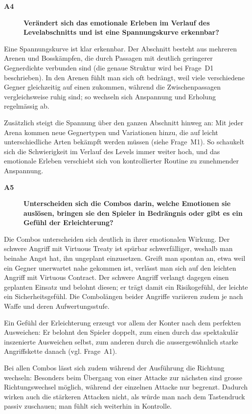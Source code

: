 \documentclass[../Main.tex]{subfiles}
\begin{document}
\begin{description}
  \item[\textbf{A4}] \textbf{Verändert sich das emotionale Erleben im Verlauf des Levelabschnitts und ist eine Spannungskurve erkennbar?}
\end{description}

Eine Spannungskurve ist klar erkennbar. Der Abschnitt besteht aus mehreren Arenen und Bosskämpfen, die durch Passagen mit deutlich geringerer Gegnerdichte verbunden sind (die genaue Struktur wird bei Frage~D1 beschrieben). In den Arenen fühlt man sich oft bedrängt, weil viele verschiedene Gegner gleichzeitig auf einen zukommen, während die Zwischenpassagen vergleichsweise ruhig sind; so wechseln sich Anspannung und Erholung regelmässig ab.

Zusätzlich steigt die Spannung über den ganzen Abschnitt hinweg an: Mit jeder Arena kommen neue Gegnertypen und Variationen hinzu, die auf leicht unterschiedliche Arten bekämpft werden müssen (siehe Frage~M1). So schaukelt sich die Schwierigkeit im Verlauf des Levels immer weiter hoch, und das emotionale Erleben verschiebt sich von kontrollierter Routine zu zunehmender Anspannung.

\begin{description}
  \item[\textbf{A5}] \textbf{Unterscheiden sich die Combos darin, welche Emotionen sie auslösen, bringen sie den Spieler in Bedrängnis oder gibt es ein Gefühl der Erleichterung?}
\end{description}

Die Combos unterscheiden sich deutlich in ihrer emotionalen Wirkung. Der schwere Angriff mit Virtuous Treaty ist spürbar schwerfälliger, weshalb man beinahe Angst hat, ihn ungeplant einzusetzen. Greift man spontan an, etwa weil ein Gegner unerwartet nahe gekommen ist, verlässt man sich auf den leichten Angriff mit Virtuous Contract. Der schwere Angriff verlangt dagegen einen geplanten Einsatz und belohnt diesen; er trägt damit ein Risikogefühl, der leichte ein Sicherheitsgefühl. Die Combolängen beider Angriffe variieren zudem je nach Waffe und deren Aufwertungsstufe.

Ein Gefühl der Erleichterung erzeugt vor allem der Konter nach dem perfekten Ausweichen: Er belohnt den Spieler doppelt, zum einen durch das spektakulär inszenierte Ausweichen selbst, zum anderen durch die aussergewöhnlich starke Angriffskette danach (vgl. Frage~A1).

Bei allen Combos lässt sich zudem während der Ausführung die Richtung wechseln: Besonders beim Übergang von einer Attacke zur nächsten sind grosse Richtungswechsel möglich, während der einzelnen Attacke nur begrenzt. Dadurch wirken auch die stärkeren Attacken nicht, als würde man nach dem Tastendruck passiv zuschauen; man fühlt sich weiterhin in Kontrolle.
\end{document}
